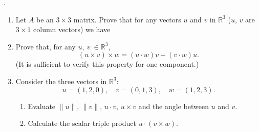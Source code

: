 \documentclass[12pt,a4paper]{article}
\def\marks#1{\hfill\rlap{~~~~~~~~~~~#1}}
\begin{document}
	
	
	




.





\item %
\begin{enumerate}

\item Let $A$ be an $3\times 3$ matrix. Prove that for any vectors $u$ and $v$  in $\mathbb{R}^3$ ($u$, $v$ are $3\times 1$ column vectors) we have


	\item Prove that, for any $u,\:v\:\in\mathbb{R}^3$, \marks{8}
	$$(u\times v)\times w= (u\cdot w)v - (v\cdot w)u.$$
	(It is sufficient to verify this property for one component.)
	\item\vfill
	Consider the three vectors in $\mathbb{R}^3$:
	$$
	u = (1, 2, 0), \quad v = (0, 1, 3),\quad w = (1, 2, 3).
	$$
	\begin{enumerate}
		\item  Evaluate $\|u\|$, $\|v\|$, $u\cdot v$, $u\times v$ and the angle between $u$ and $v$. \marks{3}
		
		\medskip\item Calculate the scalar triple product  $u\cdot(v \times w)$.\marks{3}
	\end{enumerate}\vfill
\end{enumerate}
\end{document}
